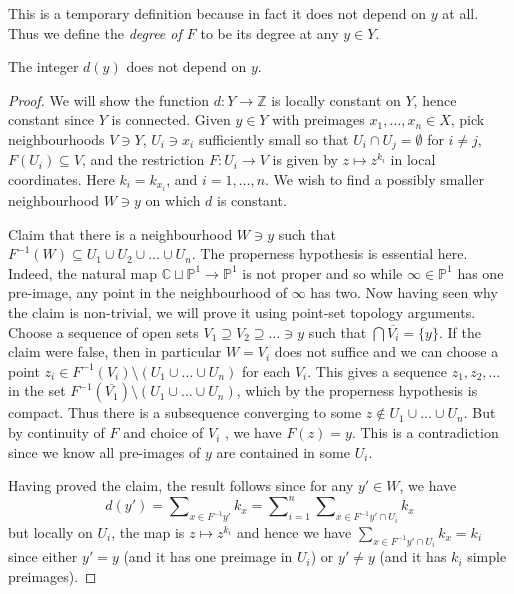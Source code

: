 This is a temporary definition because in fact it does not depend on \(y\) at
all. Thus we define the \textit{degree of \(F\)} to be its degree at any \(y\in
Y\).

\begin{proposition}
    The integer \(d(y)\) does not depend on \(y\).

    \begin{proof}
        We will show the function \(d:Y\to \mathbb{Z}\) is locally constant on
        \(Y\), hence constant since \(Y\) is connected. Given \(y\in Y\) with
        preimages \(x_1,\ldots,x_n\in X\), pick neighbourhoods \(V\ni Y\),
        \(U_i\ni x_i\) sufficiently small so that \(U_i\cap U_j=\emptyset\) for
        \(i\neq j\), \(F(U_i)\subseteq V\), and the
        restriction \(F:U_i\to V\) is given by \(z\mapsto z^{k_i}\) in local
        coordinates. Here \(k_i=k_{x_i}\), and \(i=1,\ldots,n\). We wish to find a
        possibly smaller neighbourhood \(W\ni y\) on which \(d\) is constant.

        Claim that there is a neighbourhood \(W\ni y\) such that
        \(F^{-1}(W)\subseteq U_1\cup U_2\cup \ldots \cup U_n\). The properness
        hypothesis is essential here. Indeed, the natural map \(\mathbb{C}\sqcup
        \mathbb{P}^1\to \mathbb{P}^1\) is not proper and so while \(\infty \in
        \mathbb{P}^1\) has one pre-image, any point in the neighbourhood of
        \(\infty\) has two. Now having seen why the claim is non-trivial, we
        will prove it using point-set topology arguments. Choose a sequence of
        open sets \(V_1\supseteq V_2 \supseteq \ldots \ni y\) such that \(\bigcap
        \overline{V_i}=\{y\}\). If the claim were false, then in particular
        \(W=V_i\) does not suffice and we can choose a point
        \(z_i\in F^{-1}(V_i)\setminus (U_1\cup  \ldots \cup U_n)\) for each
        \(V_i\). This gives a sequence \(z_1,z_2,\ldots\) in the set
        \(F^{-1}(\overline{V_1})\setminus (U_1\cup \ldots \cup U_n)\), which by the
        properness hypothesis is compact. Thus there is a subsequence converging
        to some \(z\notin U_1\cup \ldots \cup U_n\). But by continuity of \(F\) and
        choice of \(V_i\) , we have \(F(z)=y\). This is a contradiction since we
        know all pre-images of \(y\) are contained in some \(U_i\).

        Having proved the claim, the result follows since for any \(y'\in W\),
        we have
        \[
            d(y')=\sum\nolimits_{x\in F^{-1}y'}k_x = \sum\nolimits_{i=1}^n
            \sum\nolimits_{x\in
            F^{-1}y'\cap U_i} k_x
        \]
        but locally on \(U_i\), the map is \(z\mapsto z^{k_i}\) and hence we
        have \(\sum\nolimits_{x\in F^{-1}y'\cap U_i} k_x =k_i\) since either
        \(y'=y\) (and it has one preimage in \(U_i\)) or \(y'\neq y\) (and it
        has \(k_i\) simple preimages).
    \end{proof}
\end{proposition}

